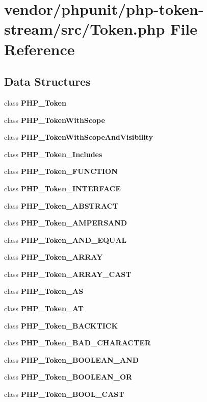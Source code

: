 \section{vendor/phpunit/php-\/token-\/stream/src/\+Token.php File Reference}
\label{phpunit_2php-token-stream_2src_2_token_8php}
\subsection*{Data Structures}
\begin{DoxyCompactItemize}
\item 
class {\bf P\+H\+P\+\_\+\+Token}
\item 
class {\bf P\+H\+P\+\_\+\+Token\+With\+Scope}
\item 
class {\bf P\+H\+P\+\_\+\+Token\+With\+Scope\+And\+Visibility}
\item 
class {\bf P\+H\+P\+\_\+\+Token\+\_\+\+Includes}
\item 
class {\bf P\+H\+P\+\_\+\+Token\+\_\+\+F\+U\+N\+C\+T\+I\+O\+N}
\item 
class {\bf P\+H\+P\+\_\+\+Token\+\_\+\+I\+N\+T\+E\+R\+F\+A\+C\+E}
\item 
class {\bf P\+H\+P\+\_\+\+Token\+\_\+\+A\+B\+S\+T\+R\+A\+C\+T}
\item 
class {\bf P\+H\+P\+\_\+\+Token\+\_\+\+A\+M\+P\+E\+R\+S\+A\+N\+D}
\item 
class {\bf P\+H\+P\+\_\+\+Token\+\_\+\+A\+N\+D\+\_\+\+E\+Q\+U\+A\+L}
\item 
class {\bf P\+H\+P\+\_\+\+Token\+\_\+\+A\+R\+R\+A\+Y}
\item 
class {\bf P\+H\+P\+\_\+\+Token\+\_\+\+A\+R\+R\+A\+Y\+\_\+\+C\+A\+S\+T}
\item 
class {\bf P\+H\+P\+\_\+\+Token\+\_\+\+A\+S}
\item 
class {\bf P\+H\+P\+\_\+\+Token\+\_\+\+A\+T}
\item 
class {\bf P\+H\+P\+\_\+\+Token\+\_\+\+B\+A\+C\+K\+T\+I\+C\+K}
\item 
class {\bf P\+H\+P\+\_\+\+Token\+\_\+\+B\+A\+D\+\_\+\+C\+H\+A\+R\+A\+C\+T\+E\+R}
\item 
class {\bf P\+H\+P\+\_\+\+Token\+\_\+\+B\+O\+O\+L\+E\+A\+N\+\_\+\+A\+N\+D}
\item 
class {\bf P\+H\+P\+\_\+\+Token\+\_\+\+B\+O\+O\+L\+E\+A\+N\+\_\+\+O\+R}
\item 
class {\bf P\+H\+P\+\_\+\+Token\+\_\+\+B\+O\+O\+L\+\_\+\+C\+A\+S\+T}

\end{DoxyCompactItemize}

